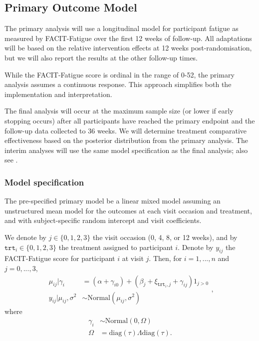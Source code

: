 \documentclass[
]{article}
\begin{document}
\hypertarget{primary-model}{%
  \subsection{Primary Outcome Model}\label{primary-model}}

The primary analysis will use a longitudinal model for participant fatigue as measured by FACIT-Fatigue over the first 12 weeks of follow-up.
All adaptations will be based on the relative intervention effects at 12 weeks post-randomisation, but we will also report the results at the other follow-up times.

While the FACIT-Fatigue score is ordinal in the range of 0-52, the primary analysis assumes a continuous response.
This approach simplifies both the implementation and interpretation.

The final analysis will occur at the maximum sample size (or lower if early stopping occurs) after all participants have reached the primary endpoint and the follow-up data collected to 36 weeks.
We will determine treatment comparative effectiveness based on the posterior distribution from the primary analysis.
The interim analyses will use the same model specification as the final analysis; also see .

\hypertarget{model-specification}{%
  \subsubsection{Model specification}\label{model-specification}}

The pre-specified primary model  be a linear mixed model assuming an unstructured mean model for the outcomes at each visit occasion and treatment, and with subject-specific random intercept and visit coefficients.

We denote by $j\in\{0,1,2,3\}$ the visit occasion (0, 4, 8, or 12 weeks), and by $\texttt{trt}_i\in\{0,1,2,3\}$ the treatment assigned to participant $i$.
Denote by $y_{ij}$ the FACIT-Fatigue score for participant $i$ at visit $j$.
Then, for $i=1,...,n$ and $j=0,...,3$,
$$
\begin{aligned}
\mu_{ij}|\gamma_i &= (\alpha+\gamma_{i0}) + (\beta_j + \xi_{\texttt{trt}_i,j} + \gamma_{ij})1_{j>0} \\
y_{ij}|\mu_{ij},\sigma^2 &\sim \text{Normal}\left(\mu_{ij}, \sigma^2\right)
\end{aligned},
$$
where
$$
\begin{aligned}
  \gamma_i &\sim \text{Normal}\left(0, \Omega\right) \\
  \Omega &= \text{diag}(\tau)\Lambda\text{diag}(\tau).
\end{aligned}
$$
\end{document}
